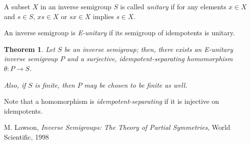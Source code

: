 \documentclass[12pt]{article}
\newtheorem*{thm}{Theorem}
\begin{document}
A subset $X$ in an inverse semigroup $S$ is called \emph{unitary} if for any elements $x\in X$ and $s\in S$, $xs\in X$ or $sx\in X$ implies $s\in X$.

An inverse semigroup is \emph{E-unitary} if its semigroup of idempotents is unitary.

\begin{thm}
Let $S$ be an inverse semigroup; then, there exists an E-unitary inverse semigroup $P$ and a surjective, idempotent-separating homomorphism $\theta:P\rightarrow S$.

Also, if $S$ is finite, then $P$ may be chosen to be finite as well.
\end{thm}

Note that a homomorphism is \emph{idempotent-separating} if it is injective on idempotents.

\begin{thebibliography}{}
\bibitem{} M. Lawson, \emph{Inverse Semigroups: The Theory of Partial Symmetries}, World Scientific, 1998
\end{thebibliography}
\end{document}
